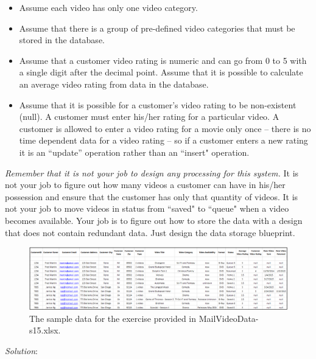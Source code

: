 \documentclass{article}
\begin{document}
\begin{itemize}
  \item Assume each video has only one video category.

  \item Assume that there is a group of pre-defined video categories that must be stored in the database.

  \item Assume that a customer video rating is numeric and can go from 0 to 5 with a single digit after the decimal point. Assume that it is possible to calculate an average video rating from data in the database.

  \item Assume that it is possible for a customer’s video rating to be non-existent (null). A customer must enter his/her rating for a particular video. A customer is allowed to enter a video rating for a movie only once – there is no time dependent data for a video rating – so if a customer enters a new rating it is an “update” operation rather than an ``insert" operation.
\end{itemize}

\emph{Remember that it is not your job to design any processing for this system.} It is not your job to figure out how many videos a customer can have in his/her possession and ensure that the customer has only that quantity of videos. It is not your job to move videos in status from ``saved" to ``queue" when a video becomes available. Your job is to figure out how to store the data with a design that does not contain redundant data. Just design the data storage blueprint. \\

\begin{figure}[h!]
  \centering
  \includegraphics[width=.95\linewidth]{HW07_Exercise01_sample_data}
  \caption{The sample data for the exercise provided in MailVideoData-s15.xlsx.}
  \label{fig:HW07_Ex01_sample_data}
\end{figure}

\newpage
\textit{Solution}:\\
\end{document}
